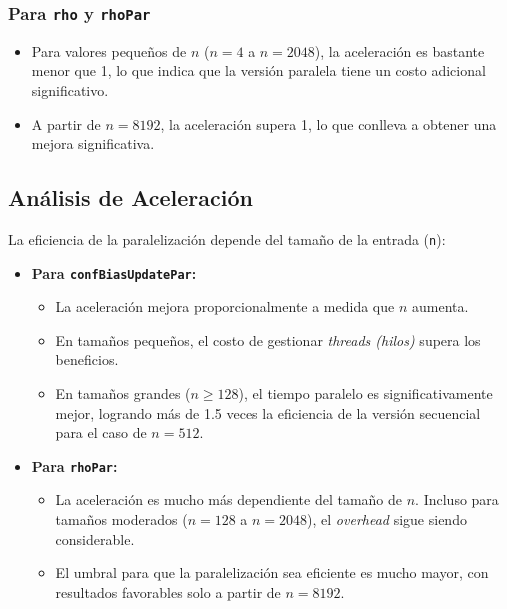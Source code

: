 \documentclass{article}
\begin{document}
    \subsubsection{Para \texttt{rho} y \texttt{rhoPar}}
    \begin{itemize}
        \item Para valores pequeños de $n$ ($n = 4$ a $n = 2048$), la aceleración es bastante menor que 1, lo que indica que la versión paralela tiene un costo adicional significativo.
        \item A partir de $n = 8192$, la aceleración supera 1, lo que conlleva a obtener una mejora significativa.
    \end{itemize}

  \subsection{Análisis de Aceleración}
  La eficiencia de la paralelización depende del tamaño de la entrada (\texttt{n}):

  \begin{itemize}
      \item \textbf{Para \texttt{confBiasUpdatePar}:}
      \begin{itemize}
          \item La aceleración mejora proporcionalmente a medida que $n$ aumenta.
          \item En tamaños pequeños, el costo de gestionar \textit{threads (hilos)} supera los beneficios.
          \item En tamaños grandes ($n \geq 128$), el tiempo paralelo es significativamente mejor, logrando más de 1.5 veces la eficiencia de la versión secuencial para el caso de $n = 512$.
      \end{itemize}

      \item \textbf{Para \texttt{rhoPar}:}
      \begin{itemize}
          \item La aceleración es mucho más dependiente del tamaño de $n$. Incluso para tamaños moderados ($n = 128$ a $n = 2048$), el \textit{overhead} sigue siendo considerable.
          \item El umbral para que la paralelización sea eficiente es mucho mayor, con resultados favorables solo a partir de $n = 8192$.
      \end{itemize}
  \end{itemize}
\end{document}
